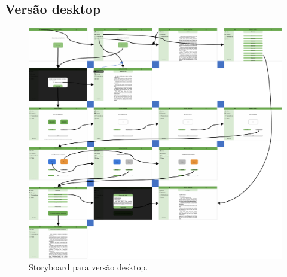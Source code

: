\subsection{Versão desktop}

\begin{figure}[h]
	\centering
	\includegraphics[width=\linewidth]{figure/prototype/desktop/storyboard.png}
	\caption{Storyboard para versão desktop.}
	\label{fig:logomarca}
\end{figure}